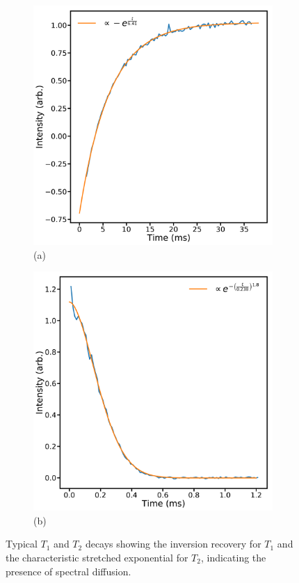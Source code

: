 \begin{figure}
\centering
\begin{subfigure}[b]{0.5\textwidth}
\includegraphics[width=\columnwidth]{Figures/T1Dark.pdf}{(a)}
\end{subfigure}%
\begin{subfigure}[b]{0.5\textwidth}
\includegraphics[width=\columnwidth]{Figures/T2Dark.pdf}{(b)}
\end{subfigure}%
\caption[$T_1$ and $T_2$ decays]{Typical $T_1$ and $T_2$ decays showing the inversion recovery for $T_1$ and the characteristic stretched exponential for $T_2$, indicating the presence of spectral diffusion.}
\label{fig:t1andt2}
\end{figure}

